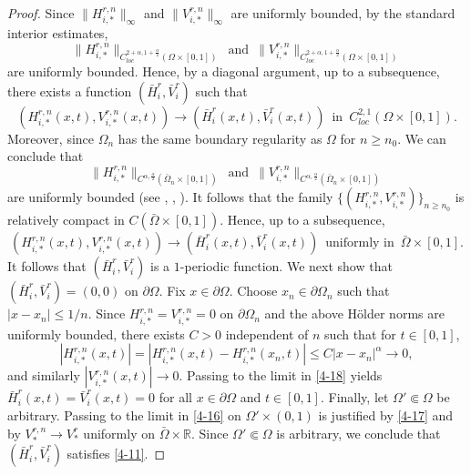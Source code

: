 \documentclass[11pt,reqno]{amsart}
\numberwithin{equation}{section}
\begin{document}
%
%
\begin{proof}
Since $\|H_{i,*}^{r,n}\|_{\infty}$ and $\|V_{i,*}^{r,n}\|_{\infty}$ are uniformly bounded, by the standard interior estimates,
\begin{equation*}
\|H_{i,*}^{r,n}\|_{C_{loc}^{2+\alpha,1+\frac{\alpha}{2}}(\Omega\times [0,1]) }
\enspace \text{and} \enspace
\|V_{i,*}^{r,n}\|_{C_{loc}^{2+\alpha,1+\frac{\alpha}{2}}(\Omega\times [0,1]) }
\end{equation*}
are uniformly bounded.
Hence, by a diagonal argument, up to a subsequence, there exists a function $(\bar{H}_{i}^{r},\bar{V}_{i}^{r})$ such that
\begin{equation}\label{4-17}
(H_{i,*}^{r,n}(x,t),V_{i,*}^{r,n}(x,t)) \to (\bar{H}_{i}^{r}(x,t),\bar{V}_{i}^{r}(x,t))
\enspace\text{in}\enspace C_{loc}^{2,1}(\Omega\times[0,1]).
\end{equation}
Moreover, since $\Omega_{n}$ has the same boundary regularity as $\Omega$ for $n\geq n_{0}$.
We can conclude that
\begin{equation*}
\|H_{i,*}^{r,n}\|_{C^{\alpha,\frac{\alpha}{2}}(\bar{\Omega}_{n}\times [0,1]) }
\enspace\text{and}\enspace
\|V_{i,*}^{r,n}\|_{C^{\alpha,\frac{\alpha}{2}}(\bar{\Omega}_{n}\times [0,1]) }
\end{equation*}
are uniformly bounded
(see \cite[Remark 4.6 (b)]{Dan}, \cite[Theorem D]{Aronson}, \cite[Corollary 7.41]{Lie}).
It follows that the family $\{(H_{i,*}^{r,n},V_{i,*}^{r,n})\}_{n\geq n_{0}}$ is relatively compact in
$C(\bar{\Omega}\times[0,1])$.
Hence, up to a subsequence,
\begin{equation}\label{4-18}
(H_{i,*}^{r,n}(x,t),V_{i,*}^{r,n}(x,t)) \to (\bar{H}_{i}^{r}(x,t),\bar{V}_{i}^{r}(x,t))
\enspace\text{uniformly in}\enspace \bar{\Omega}\times[0,1].
\end{equation}
It follows that
$(\bar{H}_{i}^{r},\bar{V}_{i}^{r})$ is a $1$-periodic function.
We next show that $(\bar H_i^r,\bar V_i^r)=(0,0)$ on $\partial\Omega$.
Fix $x\in\partial\Omega$. Choose $x_n\in\partial\Omega_n$ such that $|x-x_n|\le 1/n$.
Since $H_{i,*}^{r,n}=V_{i,*}^{r,n}=0$ on $\partial\Omega_n$ and the above H\"older norms are uniformly
bounded, there exists $C>0$ independent of $n$ such that for $t\in [0,1]$,
\begin{equation*}
|H_{i,*}^{r,n}(x,t)|
=|H_{i,*}^{r,n}(x,t)-H_{i,*}^{r,n}(x_n,t)|
\le C|x-x_n|^{\alpha}\to0,
\end{equation*}
and similarly $|V_{i,*}^{r,n}(x,t)|\to0$. Passing to the limit in \eqref{4-18} yields
$\bar H_i^r(x,t)=\bar V_i^r(x,t)=0$ for all $x\in\partial\Omega$ and $t\in[0,1]$.
Finally, let $\Omega'\Subset\Omega$ be arbitrary. Passing to the limit in \eqref{4-16} on
$\Omega'\times(0,1)$ is justified by \eqref{4-17} and by
$V_*^{r,n}\to V_*^{r}$ uniformly on $\bar\Omega\times\mathbb{R}$.
Since $\Omega'\Subset\Omega$ is arbitrary, we conclude that
$(\bar{H}_{i}^{r},\bar{V}_{i}^{r})$ satisfies \eqref{4-11}.



\end{proof}
\end{document}
